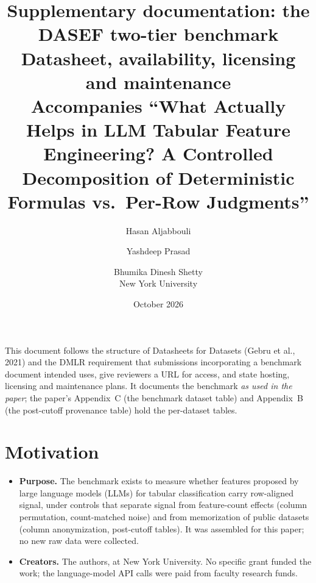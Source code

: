\documentclass[11pt]{article}
\title{Supplementary documentation: the DASEF two-tier benchmark\\[2pt]
\large Datasheet, availability, licensing and maintenance\\[2pt]
\normalsize Accompanies ``What Actually Helps in LLM Tabular Feature Engineering? A Controlled Decomposition of Deterministic Formulas vs.\ Per-Row Judgments''}
\author{Hasan Aljabbouli \and Yashdeep Prasad \and Bhumika Dinesh Shetty\\ New York University}
\date{October 2026}
\begin{document}
\maketitle

\noindent This document follows the structure of Datasheets for Datasets (Gebru et al., 2021) and the DMLR requirement that submissions incorporating a benchmark document intended uses, give reviewers a URL for access, and state hosting, licensing and maintenance plans. It documents the benchmark \emph{as used in the paper}; the paper's Appendix~C (the benchmark dataset table) and Appendix~B (the post-cutoff provenance table) hold the per-dataset tables.

\section*{Motivation}
\begin{itemize}
\item \textbf{Purpose.} The benchmark exists to measure whether features proposed by large language models (LLMs) for tabular classification carry row-aligned signal, under controls that separate signal from feature-count effects (column permutation, count-matched noise) and from memorization of public datasets (column anonymization, post-cutoff tables). It was assembled for this paper; no new raw data were collected.
\item \textbf{Creators.} The authors, at New York University. No specific grant funded the work; the language-model API calls were paid from faculty research funds.
\end{itemize}
\end{document}
